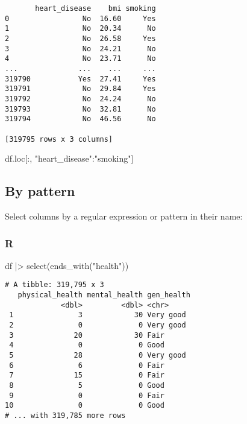 \documentclass[
  letterpaper,
  DIV=11,
  numbers=noendperiod]{scrreprt}
\newenvironment{Shaded}{\begin{snugshade}}{\end{snugshade}}
\newcommand{\FunctionTok}[1]{\textcolor[rgb]{0.28,0.35,0.67}{#1}}
\newcommand{\NormalTok}[1]{\textcolor[rgb]{0.00,0.46,0.62}{#1}}
\newcommand{\SpecialCharTok}[1]{\textcolor[rgb]{0.37,0.37,0.37}{#1}}
\newcommand{\StringTok}[1]{\textcolor[rgb]{0.13,0.47,0.30}{#1}}
\begin{document}
\begin{verbatim}
       heart_disease    bmi smoking
0                 No  16.60     Yes
1                 No  20.34      No
2                 No  26.58     Yes
3                 No  24.21      No
4                 No  23.71      No
...              ...    ...     ...
319790           Yes  27.41     Yes
319791            No  29.84     Yes
319792            No  24.24      No
319793            No  32.81      No
319794            No  46.56      No

[319795 rows x 3 columns]
\end{verbatim}

\begin{Shaded}
\begin{Highlighting}[]
\NormalTok{df.loc[:, }\StringTok{"heart\_disease"}\NormalTok{:}\StringTok{"smoking"}\NormalTok{]}
\end{Highlighting}
\end{Shaded}

\hypertarget{by-pattern}{%
\subsection{By pattern}\label{by-pattern}}

Select columns by a regular expression or pattern in their name:

\hypertarget{r-19}{%
\subsubsection{R}\label{r-19}}

\begin{Shaded}
\begin{Highlighting}[]
\NormalTok{df }\SpecialCharTok{|\textgreater{}} \FunctionTok{select}\NormalTok{(}\FunctionTok{ends\_with}\NormalTok{(}\StringTok{"health"}\NormalTok{))}
\end{Highlighting}
\end{Shaded}

\begin{verbatim}
# A tibble: 319,795 x 3
   physical_health mental_health gen_health
             <dbl>         <dbl> <chr>     
 1               3            30 Very good 
 2               0             0 Very good 
 3              20            30 Fair      
 4               0             0 Good      
 5              28             0 Very good 
 6               6             0 Fair      
 7              15             0 Fair      
 8               5             0 Good      
 9               0             0 Fair      
10               0             0 Good      
# ... with 319,785 more rows
\end{verbatim}
\end{document}
